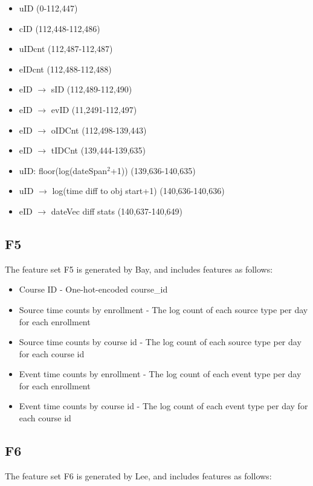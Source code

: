 \begin{itemize}
  \setlength\itemsep{0em}
  \item uID (0-112,447)
  \item cID (112,448-112,486)
  \item uIDcnt (112,487-112,487)
  \item eIDcnt (112,488-112,488)
  \item eID $\rightarrow$ sID (112,489-112,490)
  \item eID $\rightarrow$ evID (11,2491-112,497)
  \item eID $\rightarrow$ oIDCnt (112,498-139,443)
  \item eID $\rightarrow$ tIDCnt (139,444-139,635)
  \item uID: floor(log(dateSpan$^2$+1)) (139,636-140,635)
  \item uID $\rightarrow$ log(time diff to obj start+1) (140,636-140,636)
  \item eID $\rightarrow$ dateVec diff stats (140,637-140,649)
\end{itemize}

\subsection{F5}
The feature set F5 is generated by Bay, and includes features as follows:
\begin{itemize}
  \setlength\itemsep{0em}
  \item Course ID - One-hot-encoded course\_id
  \item Source time counts  by enrollment - The log count of each source type per day for each enrollment
  \item Source time counts by course id - The log count of each source type per day for each course id
  \item Event time counts by enrollment - The log count of each event type per day for each enrollment
  \item Event time counts by course id - The log count of each event type per day for each course id

\end{itemize}

\subsection{F6}
The feature set F6 is generated by Lee, and includes features as follows:

